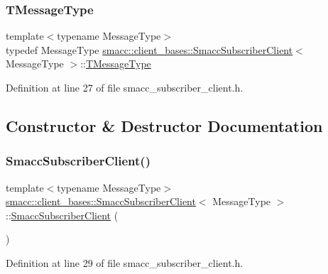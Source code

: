 \subsubsection{\texorpdfstring{T\+Message\+Type}{TMessageType}}
{\footnotesize\ttfamily template$<$typename Message\+Type$>$ \\
typedef Message\+Type \hyperlink{classsmacc_1_1client__bases_1_1SmaccSubscriberClient}{smacc\+::client\+\_\+bases\+::\+Smacc\+Subscriber\+Client}$<$ Message\+Type $>$\+::\hyperlink{classsmacc_1_1client__bases_1_1SmaccSubscriberClient_a61d798bda71bf335d72e61928ca561b0}{T\+Message\+Type}}



Definition at line 27 of file smacc\+\_\+subscriber\+\_\+client.\+h.



\subsection{Constructor \& Destructor Documentation}
\mbox{\label{classsmacc_1_1client__bases_1_1SmaccSubscriberClient_a9c3dd9981beb495a0646667acae06d73}} 
\subsubsection{\texorpdfstring{Smacc\+Subscriber\+Client()}{SmaccSubscriberClient()}\hspace{0.1cm}{\footnotesize\ttfamily [1/2]}}
{\footnotesize\ttfamily template$<$typename Message\+Type$>$ \\
\hyperlink{classsmacc_1_1client__bases_1_1SmaccSubscriberClient}{smacc\+::client\+\_\+bases\+::\+Smacc\+Subscriber\+Client}$<$ Message\+Type $>$\+::\hyperlink{classsmacc_1_1client__bases_1_1SmaccSubscriberClient}{Smacc\+Subscriber\+Client} (\begin{DoxyParamCaption}{ }\end{DoxyParamCaption})\hspace{0.3cm}{\ttfamily [inline]}}



Definition at line 29 of file smacc\+\_\+subscriber\+\_\+client.\+h.


